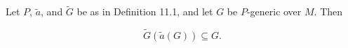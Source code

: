 Let $P$, $\tilde{a}$, and $\tilde{G}$ be as in Definition 11.1, and let $G$ be $P$-generic over $M$. Then

$$\tilde{G}(\tilde{a}(G)) \subseteq G.$$
